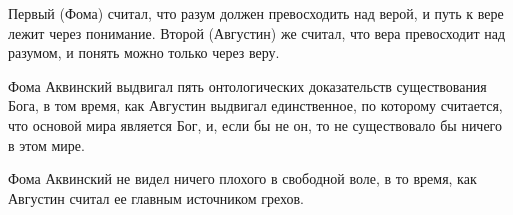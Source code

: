 \documentclass[14pt]{extarticle}
\begin{document}
Первый (Фома) считал, что разум должен превосходить над верой, и путь к вере лежит через понимание. Второй (Августин) же считал, что вера превосходит над разумом, и понять можно только через веру.

Фома Аквинский выдвигал пять онтологических доказательств существования Бога, в том время, как Августин выдвигал единственное, по которому считается, что основой мира является Бог, и, если бы не он, то не существовало бы ничего в этом мире.

Фома Аквинский не видел ничего плохого в свободной воле, в то время, как Августин считал ее главным источником грехов.
\end{document}
